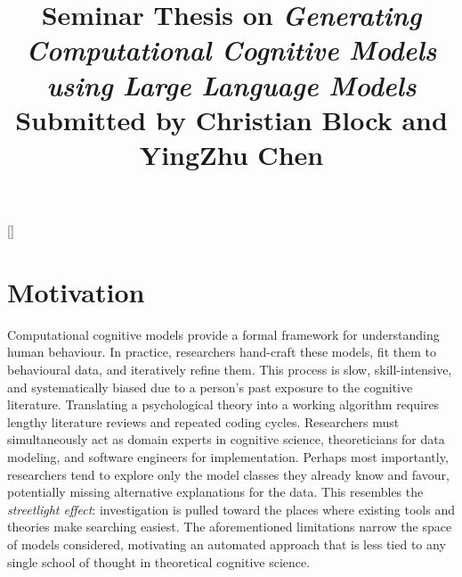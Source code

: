 \titleformat{\section}{\large\bfseries}{}{0em}{}[\titlerule]
\titleformat{\subsection}{\normalsize\bfseries}{}{0em}{}

\title{\textbf{Seminar Thesis on \textit{Generating Computational Cognitive Models
using Large Language Models}}\\
\large Submitted by Christian Block and YingZhu Chen}

\author{}
\date{}



\maketitle
\tableofcontents

\section{Motivation}

Computational cognitive models provide a formal framework for understanding human behaviour. In practice, researchers hand-craft these models, fit them to behavioural data, and iteratively refine them. This process is slow, skill-intensive, and systematically biased due to a person's past exposure to the cognitive literature. Translating a psychological theory into a working algorithm requires lengthy literature reviews and repeated coding cycles. Researchers must simultaneously act as domain experts in cognitive science, theoreticians for data modeling, and software engineers for implementation. Perhaps most importantly, researchers tend to explore only the model classes they already know and favour, potentially missing alternative explanations for the data. This resembles the \emph{streetlight effect}: investigation is pulled toward the places where existing tools and theories make searching easiest. The aforementioned limitations narrow the space of models considered, motivating an automated approach that is less tied to any single school of thought in theoretical cognitive science.\\

